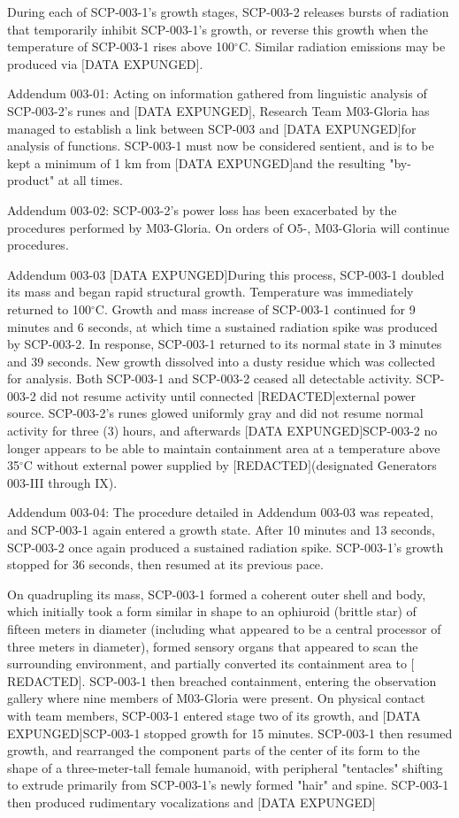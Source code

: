 \documentclass[a4paper, 11pt]{article}
\newcommand{\lb}{\ensuremath{[}}
\newcommand{\rb}{\ensuremath{]}}
\newcommand{\degree}{$^{\circ}$}
\newcommand{\redacted}{\lb REDACTED\rb}
\newcommand{\expunged}{\lb DATA EXPUNGED\rb}
\begin{document}
During each of SCP-003-1's growth stages, SCP-003-2 releases bursts of radiation that temporarily inhibit SCP-003-1's growth, or reverse this growth when the temperature of SCP-003-1 rises above 100\degree C. Similar radiation emissions may be produced via \expunged.

Addendum 003-01: Acting on information gathered from linguistic analysis of SCP-003-2's runes and \expunged, Research Team M03-Gloria has managed to establish a link between SCP-003 and \expunged for analysis of functions. SCP-003-1 must now be considered sentient, and is to be kept a minimum of 1 km from \expunged and the resulting "by-product" at all times.

Addendum 003-02: SCP-003-2's power loss has been exacerbated by the procedures performed by M03-Gloria. On orders of O5-, M03-Gloria will continue procedures.

Addendum 003-03 \expunged During this process, SCP-003-1 doubled its mass and began rapid structural growth. Temperature was immediately returned to 100\degree C. Growth and mass increase of SCP-003-1 continued for 9 minutes and 6 seconds, at which time a sustained radiation spike was produced by SCP-003-2. In response, SCP-003-1 returned to its normal state in 3 minutes and 39 seconds. New growth dissolved into a dusty residue which was collected for analysis. Both SCP-003-1 and SCP-003-2 ceased all detectable activity. SCP-003-2 did not resume activity until connected \redacted external power source. SCP-003-2's runes glowed uniformly gray and did not resume normal activity for three (3) hours, and afterwards \expunged SCP-003-2 no longer appears to be able to maintain containment area at a temperature above 35\degree C without external power supplied by \redacted (designated Generators 003-III through IX).

Addendum 003-04: The procedure detailed in Addendum 003-03 was repeated, and SCP-003-1 again entered a growth state. After 10 minutes and 13 seconds, SCP-003-2 once again produced a sustained radiation spike. SCP-003-1's growth stopped for 36 seconds, then resumed at its previous pace.

On quadrupling its mass, SCP-003-1 formed a coherent outer shell and body, which initially took a form similar in shape to an ophiuroid (brittle star) of fifteen meters in diameter (including what appeared to be a central processor of three meters in diameter), formed sensory organs that appeared to scan the surrounding environment, and partially converted its containment area to \redacted. SCP-003-1 then breached containment, entering the observation gallery where nine members of M03-Gloria were present. On physical contact with team members, SCP-003-1 entered stage two of its growth, and \expunged SCP-003-1 stopped growth for 15 minutes. SCP-003-1 then resumed growth, and rearranged the component parts of the center of its form to the shape of a three-meter-tall female humanoid, with peripheral "tentacles" shifting to extrude primarily from SCP-003-1's newly formed "hair" and spine. SCP-003-1 then produced rudimentary vocalizations and \expunged
\end{document}

